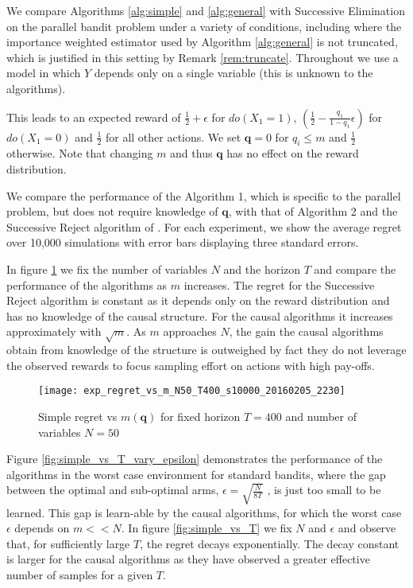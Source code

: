 We compare Algorithms \ref{alg:simple} and \ref{alg:general} with Successive Elimination on the parallel bandit problem
under a variety of conditions, including where the importance weighted estimator used by Algorithm \ref{alg:general} is not truncated,
which is justified in this setting by Remark \ref{rem:truncate}. Throughout we use a model in which $Y$ depends only on a single variable (this is unknown to the algorithms). 

This leads to an expected reward of $\frac{1}{2}+\epsilon$ for $do(X_1=1)$, $\left(\frac{1}{2}-\frac{q_1}{1-q_1}\epsilon\right)$ for $do(X_1=0)$ and $\frac{1}{2}$ for all other actions. We set $\boldsymbol{q} = 0$ for $q_i \leq m$ and $\frac{1}{2}$ otherwise. Note that changing $m$ and thus $\boldsymbol{q}$ has no effect on the reward distribution. 

We compare the performance of the Algorithm 1, which is specific to the parallel problem, but does not require knowledge of $\boldsymbol{q}$, with that of Algorithm 2 and the Successive Reject algorithm of \cite{audibert2010best}. For each experiment, we show the average regret over 10,000 simulations with error bars displaying three standard errors.

In figure \ref{fig:simple_vs_m} we fix the number of variables $N$ and the horizon $T$ and compare the performance of the algorithms as $m$ increases. The regret for the Successive Reject algorithm is constant as it depends only on the reward distribution and has no knowledge of the causal structure. For the causal algorithms it increases approximately with $\sqrt{m}$. As $m$ approaches $N$, the gain the causal algorithms obtain from knowledge of the structure is outweighed by fact they do not leverage the observed rewards to focus sampling effort on actions with high pay-offs.

\begin{figure}[h]
\centering
\texttt{[image: exp\_regret\_vs\_m\_N50\_T400\_s10000\_20160205\_2230]}
\caption{Simple regret vs $m(\boldsymbol{q})$ for fixed horizon $T=400$ and number of variables $N = 50$}
\label{fig:simple_vs_m}
\end{figure}

Figure \ref{fig:simple_vs_T_vary_epsilon} demonstrates the performance of the algorithms in the worst case environment for standard bandits, where the gap between the optimal and sub-optimal arms, $\epsilon = \sqrt{\frac{N}{8T}}$ , is just too small to be learned. This gap is learn-able by the causal algorithms, for which the worst case $\epsilon$ depends on $m << N$. In figure \ref{fig:simple_vs_T} we fix $N$ and $\epsilon$ and observe that, for sufficiently large $T$, the regret decays exponentially. The decay constant is larger for the causal algorithms as they have observed a greater effective number of samples for a given $T$. 

